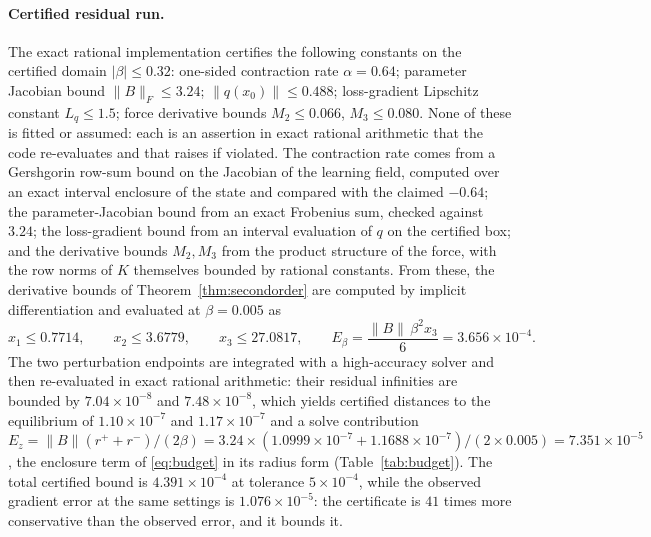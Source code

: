 \documentclass[11pt]{article}
\theoremstyle{definition}
\theoremstyle{remark}
\newcommand{\norm}[1]{\lVert #1 \rVert}
\newcommand{\abs}[1]{\lvert #1 \rvert}
\begin{document}
\paragraph{Certified residual run.}
The exact rational implementation certifies the following constants on the certified domain
$\abs{\beta} \le 0.32$: one-sided contraction rate $\alpha = 0.64$; parameter Jacobian bound
$\norm{B}_F \le 3.24$; $\norm{q(x_0)} \le 0.488$; loss-gradient Lipschitz constant $L_q \le 1.5$;
force derivative bounds $M_2 \le 0.066$, $M_3 \le 0.080$. None of these is fitted or assumed: each
is an assertion in exact rational arithmetic that the code re-evaluates and that raises if
violated. The contraction rate comes from a Gershgorin row-sum bound on the Jacobian of the
learning field, computed over an exact interval enclosure of the state and compared with the
claimed $-0.64$; the parameter-Jacobian bound from an exact Frobenius sum, checked against
$3.24$; the loss-gradient bound from an interval evaluation of $q$ on the certified box; and the
derivative bounds $M_2, M_3$ from the product structure of the force, with the row norms of $K$
themselves bounded by rational constants. From these, the derivative bounds of
Theorem~\ref{thm:secondorder} are computed by implicit differentiation and evaluated at
$\beta = 0.005$ as
\begin{equation}
x_1 \le 0.7714, \qquad x_2 \le 3.6779, \qquad x_3 \le 27.0817,
\qquad E_\beta = \frac{\norm{B}\,\beta^2 x_3}{6} = 3.656\times10^{-4}.
\label{eq:x123}
\end{equation}
The two perturbation endpoints are integrated with a high-accuracy solver and then re-evaluated in
exact rational arithmetic: their residual infinities are bounded by $7.04\times10^{-8}$ and
$7.48\times10^{-8}$, which yields certified distances to the equilibrium of
$1.10\times10^{-7}$ and $1.17\times10^{-7}$ and a solve contribution
$E_z = \norm{B}(r^+ + r^-)/(2\beta) = 3.24 \times (1.0999\times10^{-7} + 1.1688\times10^{-7})/(2\times 0.005) = 7.351\times10^{-5}$,
the enclosure term of \eqref{eq:budget} in its radius form
(Table~\ref{tab:budget}). The total certified bound is $4.391\times10^{-4}$ at tolerance
$5\times10^{-4}$, while the observed gradient error at the same settings is
$1.076\times10^{-5}$: the certificate is $41$ times more conservative than the observed error, and it bounds
it.
\end{document}

